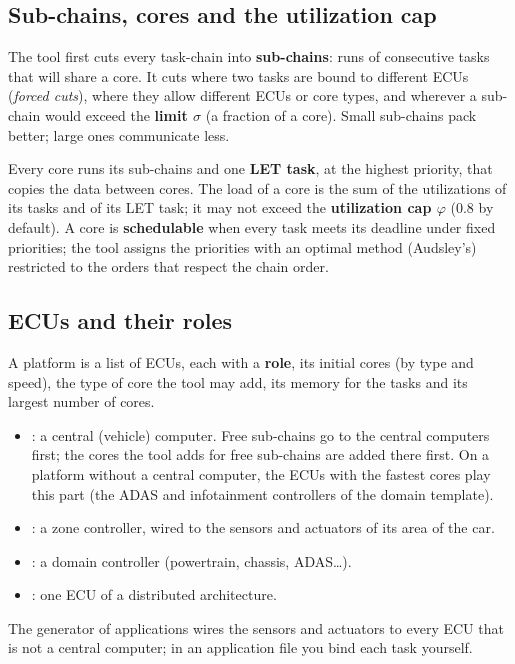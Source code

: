 \subsection{Sub-chains, cores and the utilization cap}

The tool first cuts every task-chain into \textbf{sub-chains}: runs of
consecutive tasks that will share a core. It cuts where two tasks are bound
to different ECUs (\emph{forced cuts}), where they allow different ECUs or
core types, and wherever a sub-chain would exceed the \textbf{limit
$\sigma$} (a fraction of a core). Small sub-chains pack better; large ones
communicate less.

Every core runs its sub-chains and one \textbf{LET task}, at the highest
priority, that copies the data between cores. The load of a core is the
sum of the utilizations of its tasks and of its LET task; it may not exceed
the \textbf{utilization cap $\varphi$} (0.8 by default). A core is
\textbf{schedulable} when every task meets its deadline under fixed
priorities; the tool assigns the priorities with an optimal method
(Audsley's) restricted to the orders that respect the chain order.

\subsection{ECUs and their roles}

A platform is a list of ECUs, each with a \textbf{role}, its initial
cores (by type and speed), the type of core the tool may add, its memory
for the tasks and its largest number of cores.
\begin{itemize}
\item {}: a central (vehicle) computer. Free sub-chains go to
the central computers first; the cores the tool adds for free sub-chains
are added there first. On a platform without a central computer, the ECUs
with the fastest cores play this part (the ADAS and infotainment
controllers of the domain template).
\item {}: a zone controller, wired to the sensors and actuators of
its area of the car.
\item {}: a domain controller (powertrain, chassis, ADAS\dots).
\item {}: one ECU of a distributed architecture.
\end{itemize}
The generator of applications wires the sensors and actuators to every ECU
that is not a central computer; in an application file you bind each task
yourself.


